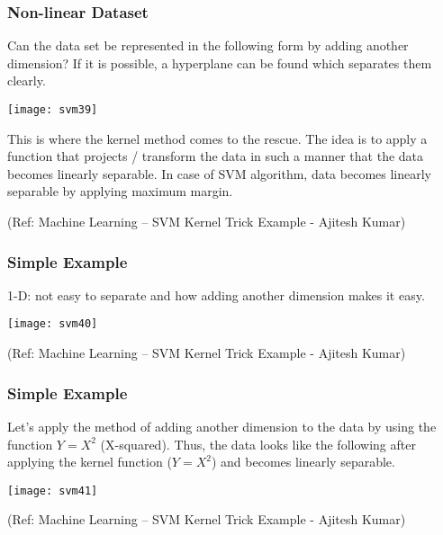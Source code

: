 \begin{frame}[fragile] \frametitle{Non-linear Dataset}

Can the data set be represented in the following form by adding another dimension? If it is possible, a hyperplane can be found which separates them clearly.

\begin{center}
\texttt{[image: svm39]}

\end{center}

This is where the kernel method comes to the rescue. The idea is to apply a function that projects / transform the data in such a manner that the data becomes linearly separable. In case of SVM algorithm, data becomes linearly separable by applying maximum margin.

{\tiny (Ref: Machine Learning – SVM Kernel Trick Example - Ajitesh Kumar)}
\end{frame}

\begin{frame}[fragile] \frametitle{Simple Example}

1-D: not easy to separate and how adding another dimension makes it easy.

\begin{center}
\texttt{[image: svm40]}

\end{center}

{\tiny (Ref: Machine Learning – SVM Kernel Trick Example - Ajitesh Kumar)}
\end{frame}

\begin{frame}[fragile] \frametitle{Simple Example}

Let’s apply the method of adding another dimension to the data by using the function $Y = X^2$ (X-squared). Thus, the data looks like the following after applying the kernel function ($Y = X^2$) and becomes linearly separable.
\begin{center}
\texttt{[image: svm41]}

\end{center}

{\tiny (Ref: Machine Learning – SVM Kernel Trick Example - Ajitesh Kumar)}
\end{frame}

